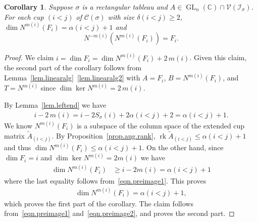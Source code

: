 \documentclass[11pt]{amsart}
\newtheorem{corollary}[theorem]{Corollary}
\theoremstyle{remark}
\theoremstyle{remark}
\theoremstyle{definition}
\theoremstyle{definition}
\theoremstyle{definition}
\numberwithin{equation}{section}
\newcommand{\C}{\mathbb{C}}           %
\renewcommand{\ker}{\operatorname{ker }}
\newcommand{\rk}{\operatorname{rk}}
\newcommand{\GL}{\operatorname{GL}}
\newcommand{\ga}{\alpha}
\newcommand{\gd}{\delta}
\newcommand{\gs}{\sigma}
\newcommand{\cc}{\mathcal{C}}
\newcommand{\ci}{\mathcal{I}}
\newcommand{\cv}{\mathcal{V}}
\newcommand{\al}{\alpha}
\newcommand{\cupsigma}{\cc(\gs)}
\newcommand{\mi}[1]{m(#1)}
\begin{document}
\begin{corollary} \label{cor.preimage} Suppose $\gs$ is a rectangular tableau and $A\in \GL_n(\C)\cap \cv(\ci_\gs)$. 
For each cup $(i<j)$ of $\cupsigma$ with size $\gd(i<j)\geq 2$, $\dim N^{\mi{i}}\left(F_i\right) = \al(i<j)+1$ and 
\[
N^{-\mi{i}} \left(N^{\mi{i}}\left(F_i\right)\right)=F_i.
\]
\end{corollary}
\begin{proof} We claim $i = \dim F_i = \dim N^{\mi{i}}\left( F_i \right) + 2\,\mi{i}$. Given this claim, the second part of the corollary follows from Lemma~\ref{lem.linearalg}~\eqref{lem.linearalg2} with $A=F_i$, $B=N^{\mi{i}} \left( F_i \right)$, and $T=N^{\mi{i}}$ since $\dim \ker N^{\mi{i}} = 2\,\mi{i}$.


By Lemma~\ref{lem.leftend} we have 
\begin{eqnarray}\label{eqn.preimage1}
i-2\,\mi{i} =  i - 2S_\gs(i) +2\ga(i<j) +2 = \ga(i<j)+1.
\end{eqnarray}
We know $N^{\mi{i}} \left( F_i \right)$ is a subspace of the column space of the extended cup matrix $\widetilde{A}_{(i<j)}$. By Proposition~\ref{prop.aug.rank}, $\rk \widetilde A_{(i<j)}\leq \ga(i<j)+1$ and thus $\dim N^{\mi{i}} \left( F_i \right) \leq \ga(i<j)+1$. On the other hand, since $\dim F_i=i$ and $\dim \ker N^{\mi{i}} = 2\mi{i}$ we have 
\begin{align*}
\dim N^{\mi{i}} \left( F_i \right) &\geq i - 2\mi{i} = \al(i<j)+1
\end{align*}
where the last equality follows from~\eqref{eqn.preimage1}. This proves 
\begin{eqnarray}\label{eqn.preimage2}
\dim N^{\mi{i}}\left(F_i\right)=\ga(i<j)+1,
\end{eqnarray}
which proves the first part of the corollary.
The claim follows from~\eqref{eqn.preimage1} and~\eqref{eqn.preimage2}, and proves the second part.
\end{proof}
\end{document}
